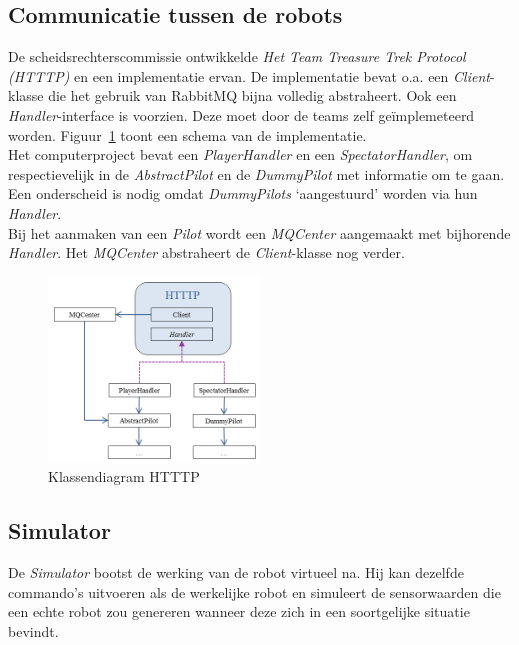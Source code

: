 \documentclass[tt3]{penoverslag}
\begin{document}
\subsection{Communicatie tussen de robots}
\label{ssec:RabbMQ}
De scheidsrechterscommissie ontwikkelde \textit{Het Team Treasure Trek Protocol (HTTTP)} en een implementatie ervan. De implementatie bevat o.a. een \textit{Client}-klasse die het gebruik van RabbitMQ bijna volledig abstraheert. Ook een \textit{Handler}-interface is voorzien. Deze moet door de teams zelf ge\"implemeteerd worden. Figuur~\ref{fig:klasHTTTP} toont een schema van de implementatie.\\

Het computerproject bevat een \textit{PlayerHandler} en een \textit{SpectatorHandler}, om respectievelijk in de \textit{AbstractPilot} en de \textit{DummyPilot} met informatie om te gaan. Een onderscheid is nodig omdat \textit{DummyPilots} `aangestuurd' worden via hun \textit{Handler}.\\

Bij het aanmaken van een \textit{Pilot} wordt een \textit{MQCenter} aangemaakt met bijhorende \textit{Handler}. Het \textit{MQCenter} abstraheert de \textit{Client}-klasse nog verder.

\begin{figure}[h]
\centering
	\includegraphics[width=0.5\textwidth]{KlasHTTTP}
\caption{Klassendiagram HTTTP}
\label{fig:klasHTTTP}
\end{figure}


\subsection{Simulator}
\label{ssec:Sim}
De \textit{Simulator} bootst de werking van de robot virtueel na. Hij kan dezelfde commando's uitvoeren als de werkelijke robot en simuleert de sensorwaarden die een echte robot zou genereren wanneer deze zich in een soortgelijke situatie bevindt.\\
\end{document}
